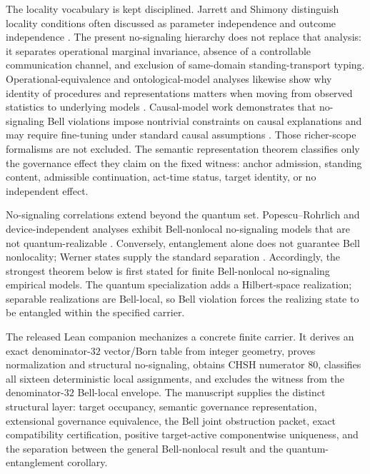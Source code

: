 \documentclass[11pt]{article}
\theoremstyle{definition}
\begin{document}
The locality vocabulary is kept disciplined. Jarrett and Shimony distinguish locality conditions often discussed as parameter independence and outcome independence \cite{Jarrett1984,Shimony1986}. The present no-signaling hierarchy does not replace that analysis: it separates operational marginal invariance, absence of a controllable communication channel, and exclusion of same-domain standing-transport typing. Operational-equivalence and ontological-model analyses likewise show why identity of procedures and representations matters when moving from observed statistics to underlying models \cite{Spekkens2005}. Causal-model work demonstrates that no-signaling Bell violations impose nontrivial constraints on causal explanations and may require fine-tuning under standard causal assumptions \cite{WoodSpekkens2015,Cavalcanti2018}. Those richer-scope formalisms are not excluded. The semantic representation theorem classifies only the governance effect they claim on the fixed witness: anchor admission, standing content, admissible continuation, act-time status, target identity, or no independent effect.

No-signaling correlations extend beyond the quantum set. Popescu--Rohrlich and device-independent analyses exhibit Bell-nonlocal no-signaling models that are not quantum-realizable \cite{PopescuRohrlich1994,BarrettEtAl2005}. Conversely, entanglement alone does not guarantee Bell nonlocality; Werner states supply the standard separation \cite{Werner1989}. Accordingly, the strongest theorem below is first stated for finite Bell-nonlocal no-signaling empirical models. The quantum specialization adds a Hilbert-space realization; separable realizations are Bell-local, so Bell violation forces the realizing state to be entangled within the specified carrier.

The released Lean companion mechanizes a concrete finite carrier. It derives an exact denominator-$32$ vector/Born table from integer geometry, proves normalization and structural no-signaling, obtains CHSH numerator $80$, classifies all sixteen deterministic local assignments, and excludes the witness from the denominator-$32$ Bell-local envelope. The manuscript supplies the distinct structural layer: target occupancy, semantic governance representation, extensional governance equivalence, the Bell joint obstruction packet, exact compatibility certification, positive target-active componentwise uniqueness, and the separation between the general Bell-nonlocal result and the quantum-entanglement corollary.
\end{document}
